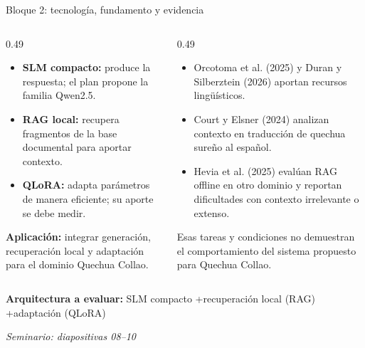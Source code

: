 \documentclass[aspectratio=169,10pt,spanish]{beamer}
\newcommand{\fuente}[1]{\vspace{0.05cm}\hfill{\color{bpNavy!65}\tiny\textit{Seminario: diapositivas #1}}}
\begin{document}
\begin{frame}{Bloque 2: tecnología, fundamento y evidencia}
    \begin{columns}[T,onlytextwidth]
        \begin{column}{0.49\textwidth}
            \begin{tcolorbox}[colback=bpLightGray,colframe=bpBlue,title=\textbf{A--B. Métodos y función},fonttitle=\small\bfseries]
                \scriptsize
                \begin{itemize}
                    \item \textbf{SLM compacto:} produce la respuesta; el plan propone la familia Qwen2.5.
                    \item \textbf{RAG local:} recupera fragmentos de la base documental para aportar contexto.
                    \item \textbf{QLoRA:} adapta parámetros de manera eficiente; su aporte se debe medir.
                \end{itemize}
                \textbf{Aplicación:} integrar generación, recuperación local y adaptación para el dominio Quechua Collao.
            \end{tcolorbox}
        \end{column}
        \begin{column}{0.49\textwidth}
            \begin{tcolorbox}[colback=white,colframe=bpGold!90!black,title=\textbf{C--D. Evidencia y límites},fonttitle=\small\bfseries]
                \scriptsize
                \begin{itemize}
                    \item Orcotoma et al. (2025) y Duran y Silberztein (2026) aportan recursos lingüísticos.
                    \item Court y Elsner (2024) analizan contexto en traducción de quechua sureño al español.
                    \item Hevia et al. (2025) evalúan RAG offline en otro dominio y reportan dificultades con contexto irrelevante o extenso.
                \end{itemize}
                Esas tareas y condiciones no demuestran el comportamiento del sistema propuesto para Quechua Collao.
            \end{tcolorbox}
        \end{column}
    \end{columns}
    \begin{tcolorbox}[colback=bpNavy,colframe=bpNavy,arc=1mm,top=1.2mm,bottom=1.2mm]
        \centering\small\color{white}
        \textbf{Arquitectura a evaluar:}\quad
        SLM compacto \quad+\quad recuperación local (RAG) \quad+\quad adaptación (QLoRA)
    \end{tcolorbox}
    \fuente{08--10}
\end{frame}
\end{document}
